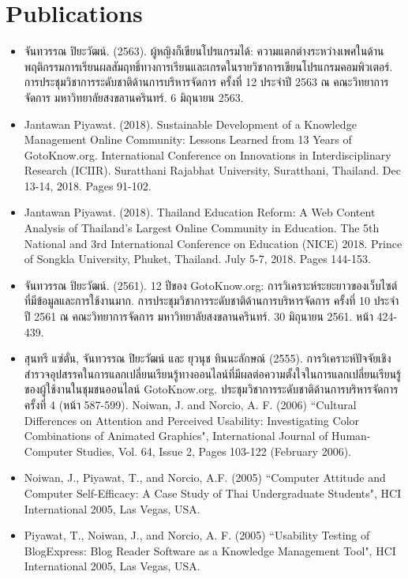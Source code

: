 \section*{Publications}

\begin{tcolorbox}[breakable,enhanced,fonttitle=\bfseries]
\begin{itemize}
	\item จันทวรรณ ปิยะวัฒน์. (2563). ผู้หญิงก็เขียนโปรแกรมได้: ความแตกต่างระหว่างเพศในด้านพฤติกรรมการเรียนผลสัมฤทธิ์ทางการเรียนและเกรดในรายวิชาการเขียนโปรแกรมคอมพิวเตอร์. การประชุมวิชาการระดับชาติด้านการบริหารจัดการ ครั้งที่ 12 ประจำปี 2563 ณ คณะวิทยาการจัดการ มหาวิทยาลัยสงขลานครินทร์. 6 มิถุนายน 2563.
	\item Jantawan Piyawat. (2018). Sustainable Development of a Knowledge Management Online Community: Lessons Learned from 13 Years of GotoKnow.org. International Conference on Innovations in Interdisciplinary Research (ICIIR). Suratthani Rajabhat University, Suratthani, Thailand. Dec 13-14, 2018. Pages 91-102.
	\item Jantawan Piyawat. (2018). Thailand Education Reform: A Web Content Analysis of Thailand’s Largest Online Community in Education. The 5th National and 3rd International Conference on Education (NICE) 2018. Prince of Songkla University, Phuket, Thailand. July 5-7, 2018. Pages 144-153.
	\item จันทวรรณ ปิยะวัฒน์. (2561). 12 ปีของ GotoKnow.org: การวิเคราะห์ระยะยาวของเว็บไซต์ที่มีข้อมูลและการใช้งานมาก. การประชุมวิชาการระดับชาติด้านการบริหารจัดการ ครั้งที่ 10 ประจำปี 2561 ณ คณะวิทยาการจัดการ มหาวิทยาลัยสงขลานครินทร์. 30 มิถุนายน 2561. หน้า 424-439. 
	\item สุนทรี แซ่ตั่น, จันทวรรณ ปิยะวัฒน์ และ ยุวนุช ทินนะลักษณ์ (2555). การวิเคราะห์ปัจจัยเชิงสำรวจอุปสรรคในการแลกเปลี่ยนเรียนรู้ทางออนไลน์ที่มีผลต่อความตั้งใจในการแลกเปลี่ยนเรียนรู้ของผู้ใช้งานในชุมชนออนไลน์ GotoKnow.org. ประชุมวิชาการระดับชาติด้านการบริหารจัดการ ครั้งที่ 4 (หน้า 587-599).
Noiwan, J. and Norcio, A. F. (2006) “Cultural Differences on Attention and Perceived Usability: Investigating Color Combinations of Animated Graphics", International Journal of Human-Computer Studies, Vol. 64, Issue 2, Pages 103-122 (February 2006).
	\item Noiwan, J., Piyawat, T., and Norcio, A.F. (2005) “Computer Attitude and Computer Self-Efficacy: A Case Study of Thai Undergraduate Students", HCI International 2005, Las Vegas, USA.
	\item Piyawat, T., Noiwan, J., and Norcio, A. F. (2005) “Usability Testing of BlogExpress: Blog Reader Software as a Knowledge Management Tool", HCI International 2005, Las Vegas, USA.

\end{itemize}
\end{tcolorbox}

